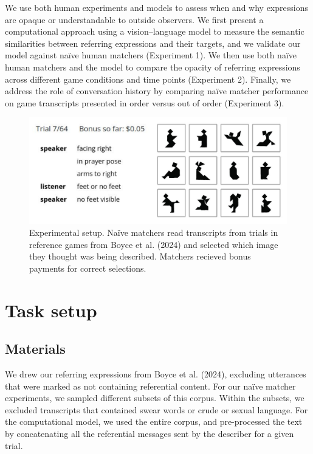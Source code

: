 \documentclass[10pt, letterpaper]{article}
\begin{document}
We use both human experiments and models to assess when and why
expressions are opaque or understandable to outside observers. We first
present a computational approach using a vision--language model to
measure the semantic similarities between referring expressions and
their targets, and we validate our model against naïve human matchers
(Experiment 1). We then use both naïve human matchers and the model to
compare the opacity of referring expressions across different game
conditions and time points (Experiment 2). Finally, we address the role
of conversation history by comparing naïve matcher performance on game
transcripts presented in order versus out of order (Experiment 3).

\begin{CodeChunk}
\begin{figure}[t!]

{\centering \includegraphics[width=1\linewidth]{matcher-diagram} 

}

\caption[Experimental setup]{Experimental setup. Naïve matchers read transcripts from trials in reference games from Boyce et al. (2024) and selected which image they thought was being described. Matchers recieved bonus payments for correct selections. \label{game}}\label{fig:interface}
\end{figure}
\end{CodeChunk}

\section{Task setup}\label{task-setup}

\subsection{Materials}\label{materials}

We drew our referring expressions from Boyce et al. (2024), excluding
utterances that were marked as not containing referential content. For
our naïve matcher experiments, we sampled different subsets of this
corpus. Within the subsets, we excluded transcripts that contained swear
words or crude or sexual language. For the computational model, we used
the entire corpus, and pre-processed the text by concatenating all the
referential messages sent by the describer for a given trial.
\end{document}

